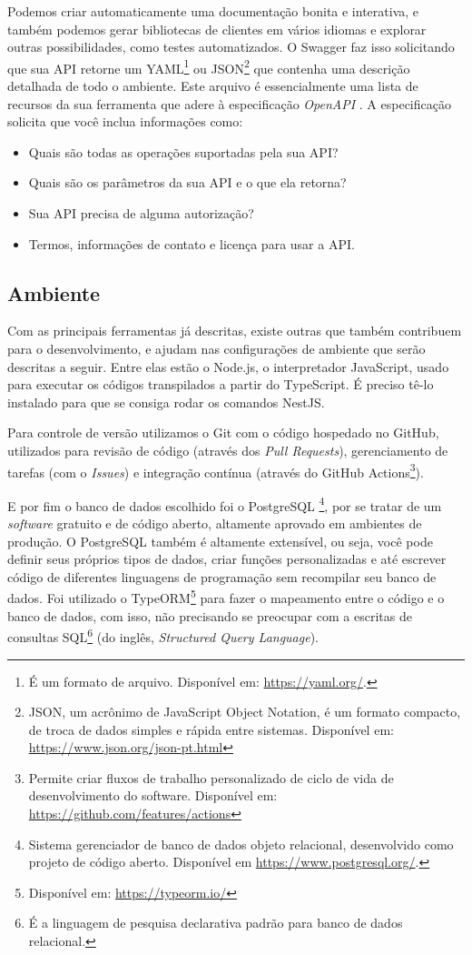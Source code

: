 Podemos criar automaticamente uma documentação bonita e interativa, e também podemos gerar bibliotecas de clientes em vários idiomas e explorar outras possibilidades, como testes automatizados. O Swagger faz isso solicitando que sua API retorne um YAML\footnote{É um formato de arquivo. Disponível em: \url{https://yaml.org/}.} ou JSON\footnote{JSON, um acrônimo de JavaScript Object Notation, é um formato compacto, de troca de dados simples e rápida entre sistemas. Disponível em: \url{https://www.json.org/json-pt.html}} que contenha uma descrição detalhada de todo o ambiente. Este arquivo é essencialmente uma lista de recursos da sua ferramenta que adere à especificação \textit{OpenAPI} \cite{smartbear2020Swagger}. A especificação solicita que você inclua informações como:

\begin{itemize}
    \item Quais são todas as operações suportadas pela sua API? 
    \item Quais são os parâmetros da sua API e o que ela retorna?   
    \item Sua API precisa de alguma autorização?
    \item Termos, informações de contato e licença para usar a API.
\end{itemize}

\subsection{Ambiente}
\label{ssec:Ambiente}
Com as principais ferramentas já descritas, existe outras que também contribuem para o desenvolvimento, e ajudam nas configurações de ambiente que serão descritas a seguir. Entre elas estão o Node.js, o interpretador JavaScript, usado para executar os códigos transpilados a partir do TypeScript. É preciso tê-lo instalado para que se consiga rodar os comandos NestJS.

Para controle de versão utilizamos o Git com o código hospedado no GitHub, utilizados para revisão de código (através dos \textit{Pull Requests}), gerenciamento de tarefas (com o \textit{Issues}) e integração contínua (através do GitHub Actions\footnote{Permite criar fluxos de trabalho personalizado de ciclo de vida de desenvolvimento do software. Disponível em: \url{https://github.com/features/actions}}). 

E por fim o banco de dados escolhido foi o PostgreSQL \footnote{Sistema gerenciador de banco de dados objeto relacional, desenvolvido como projeto de código aberto. Disponível em \url{https://www.postgresql.org/}.}, por se tratar de um \textit{software} gratuito e de código aberto, altamente aprovado em ambientes de produção. O PostgreSQL também é altamente extensível, ou seja, você pode definir seus próprios tipos de dados, criar funções personalizadas e até escrever código de diferentes linguagens de programação sem recompilar seu banco de dados. Foi utilizado o TypeORM\footnote{Disponível em: \url{https://typeorm.io/}} para fazer o mapeamento entre o código e o banco de dados, com isso, não precisando se preocupar com a escritas de consultas SQL\footnote{É a linguagem de pesquisa declarativa padrão para banco de dados relacional.} (do inglês, \textit{Structured Query Language}).
